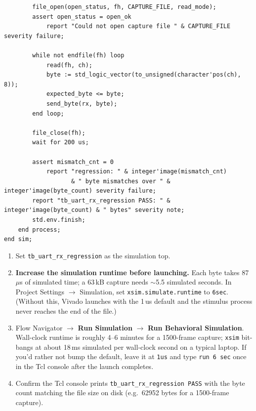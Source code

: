 \documentclass[11pt,letterpaper]{article}
\begin{document}
\begin{lstlisting}
        file_open(open_status, fh, CAPTURE_FILE, read_mode);
        assert open_status = open_ok
            report "Could not open capture file " & CAPTURE_FILE severity failure;

        while not endfile(fh) loop
            read(fh, ch);
            byte := std_logic_vector(to_unsigned(character'pos(ch), 8));
            expected_byte <= byte;
            send_byte(rx, byte);
        end loop;

        file_close(fh);
        wait for 200 us;

        assert mismatch_cnt = 0
            report "regression: " & integer'image(mismatch_cnt)
                   & " byte mismatches over " & integer'image(byte_count) severity failure;
        report "tb_uart_rx_regression PASS: " & integer'image(byte_count) & " bytes" severity note;
        std.env.finish;
    end process;
end sim;
\end{lstlisting}

\begin{enumerate}[leftmargin=2em]
	\item Set \texttt{tb\_uart\_rx\_regression} as the simulation top.
	\item \textbf{Increase the simulation runtime before launching.} Each byte takes 87\,$\mu$s of simulated time; a 63\,kB capture needs $\sim$5.5 simulated seconds. In Project Settings $\to$ Simulation, set \texttt{xsim.simulate.runtime} to \texttt{6sec}. (Without this, Vivado launches with the 1\,us default and the stimulus process never reaches the end of the file.)
	\item Flow Navigator $\to$ \textbf{Run Simulation} $\to$ \textbf{Run Behavioral Simulation}. Wall-clock runtime is roughly 4--6 minutes for a 1500-frame capture; \texttt{xsim} bit-bangs at about 18\,ms simulated per wall-clock second on a typical laptop. If you'd rather not bump the default, leave it at \texttt{1us} and type \texttt{run 6 sec} once in the Tcl console after the launch completes.
	\item Confirm the Tcl console prints \texttt{tb\_uart\_rx\_regression PASS} with the byte count matching the file size on disk (e.g.\ 62952 bytes for a 1500-frame capture).
\end{enumerate}
\end{document}
